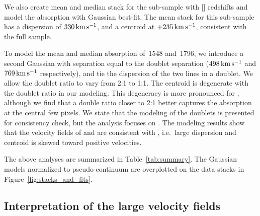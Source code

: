 \documentclass[iop]{emulateapj}
\begin{document}
We also create mean and median stack for the sub-sample with [] redshifts and model the
absorption with Gaussian best-fit. The  mean stack for this sub-sample has
a dispersion of $330\,{\rm km\,s^{-1}}$, and a centroid at $+235\,{\rm km\,s^{-1}}$,
consistent with the full sample.

To model the mean and median absorption of \,1548 and \,1796, we introduce a
second Gaussian with separation equal to the doublet separation ($498\,{\rm km\,s^{-1}}$ and
$769\,{\rm km\,s^{-1}}$ respectively), and tie the dispersion of the two lines in a doublet. We
allow the doublet ratio to vary from 2:1 to 1:1.
The centroid is degenerate with the doublet ratio in our modeling. This degeneracy is more
pronounced for , although we find that a double ratio closer to 2:1 better captures the
absorption at the central few pixels. We state that the modeling of the doublets is presented for
consistency check, but the analysis focuses on .
The modeling results show that the velocity fields
of  and  are consistent with , i.e.\ large dispersion and centroid
is skewed toward positive velocities.

The above analyses are summarized in Table~\ref{tab:summary}. The Gaussian models normalized to
pseudo-continuum are overplotted on the data stacks in Figure~\ref{fig:stacks_and_fits}.

%


\subsection{Interpretation of the large velocity fields}
\label{sec:significance_width}
\end{document}
